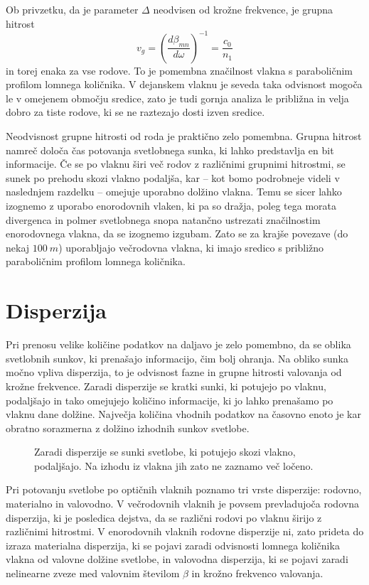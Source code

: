 Ob privzetku, da je parameter $\Delta$ neodvisen od krožne frekvence, je grupna 
hitrost
\begin{equation}
v_{g}=\left(\frac{d\beta_{mn}}{d\omega}\right)^{-1}=\frac{c_{0}}{n_{1}}
\label{9.21}
\end{equation}
in torej enaka za vse rodove. To je pomembna značilnost vlakna s paraboličnim profilom
lomnega količnika. V dejanskem vlaknu je seveda taka odvisnost mogoča
le v omejenem območju sredice, zato je tudi gornja analiza le približna
in velja dobro za tiste rodove, ki se ne raztezajo dosti izven sredice.

Neodvisnost grupne hitrosti od roda je praktično zelo pomembna. 
Grupna hitrost namreč določa čas potovanja svetlobnega sunka, ki
lahko predstavlja en bit informacije. Če se po vlaknu širi več
rodov z različnimi grupnimi hitrostmi, se sunek po prehodu skozi
vlakno podaljša, kar -- kot bomo podrobneje videli v naslednjem razdelku -- omejuje 
uporabno dolžino vlakna. Temu se sicer lahko izognemo z uporabo enorodovnih vlaken,
ki pa so dražja, poleg tega morata divergenca in polmer svetlobnega snopa 
natančno ustrezati značilnostim enorodovnega vlakna, da se izognemo izgubam. 
Zato se za krajše povezave (do nekaj $100~\si{m}$) uporabljajo večrodovna vlakna, ki imajo sredico s 
približno paraboličnim profilom lomnega količnika.

\section{Disperzija}
\label{chap:Disperzija}
Pri prenosu velike količine podatkov na daljavo je zelo pomembno, da
se oblika svetlobnih sunkov, ki prenašajo informacijo, čim bolj ohranja.
Na obliko sunka močno vpliva disperzija, to je odvisnost fazne in grupne hitrosti
valovanja od krožne frekvence. Zaradi disperzije se kratki sunki, ki potujejo po vlaknu, podaljšajo in 
tako omejujejo količino informacije, ki jo lahko prenašamo po vlaknu dane dolžine.
Največja količina vhodnih podatkov na časovno enoto je kar 
obratno sorazmerna z dolžino izhodnih sunkov svetlobe. 
\begin{figure}[h]
\centering
\def\svgwidth{120truemm} 
 
\caption{Zaradi disperzije se sunki svetlobe, ki potujejo skozi vlakno, 
podaljšajo. Na izhodu iz vlakna jih zato ne zaznamo več ločeno.}
\label{fig:disp}
\end{figure}

Pri potovanju svetlobe po optičnih vlaknih poznamo tri 
vrste disperzije: rodovno, materialno in valovodno. V večrodovnih vlaknih
je povsem prevladujoča rodovna disperzija, ki je posledica dejstva, da se 
različni rodovi po vlaknu širijo z različnimi hitrostmi. 
V enorodovnih vlaknih rodovne disperzije ni, zato prideta do izraza 
materialna disperzija, ki se pojavi zaradi odvisnosti lomnega količnika 
vlakna od valovne dolžine svetlobe, in valovodna disperzija, ki se pojavi zaradi 
nelinearne zveze med valovnim številom $\beta$ in krožno frekvenco valovanja. 


